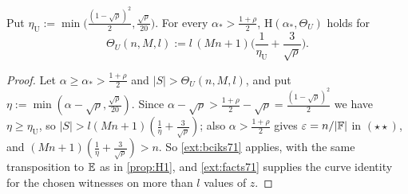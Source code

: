 {\renewcommand{\theproposition}{P-H2}
\begin{proposition}\label{prop:H2}
Put $\eta_{\mathrm U}:=\min\big(\frac{(1-\sqrt\rho)^2}2,\frac{\sqrt\rho}{20}\big)$. For every
$\alpha_*>\frac{1+\rho}2$, $\mathrm H(\alpha_*,\Theta_U)$ holds for
\[
\Theta_U(n,M,l):=l\,(Mn+1)\Big(\frac1{\eta_{\mathrm U}}+\frac3{\sqrt\rho}\Big).
\]
\end{proposition}

\begin{proof}
Let $\alpha\ge\alpha_*>\frac{1+\rho}2$ and $|S|>\Theta_U(n,M,l)$, and put
$\eta:=\min(\alpha-\sqrt\rho,\frac{\sqrt\rho}{20})$. Since
$\alpha-\sqrt\rho>\frac{1+\rho}2-\sqrt\rho=\frac{(1-\sqrt\rho)^2}2$ we have
$\eta\ge\eta_{\mathrm U}$, so $|S|>l(Mn+1)(\frac1\eta+\frac3{\sqrt\rho})$; also
$\alpha>\frac{1+\rho}2$ gives $\varepsilon=n/|\mathbb{F}|$ in $(\star\star)$, and
$(Mn+1)(\frac1\eta+\frac3{\sqrt\rho})>n$. So \cref{ext:bciks71} applies, with the same
transposition to $\mathbb{E}$ as in \cref{prop:H1}, and \cref{ext:facts71} supplies the curve identity
for the chosen witnesses on more than $l$ values of $z$.
\end{proof}
}
